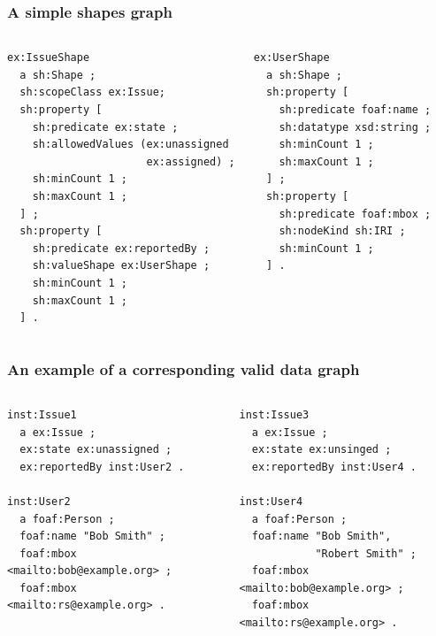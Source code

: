 \documentclass{beamer}
\begin{document}
\begin{frame}[fragile]
  \frametitle{A simple shapes graph}

  \begin{columns}[t]

    \begin{Verbatim}[fontsize=\footnotesize]
ex:IssueShape
  a sh:Shape ;
  sh:scopeClass ex:Issue;
  sh:property [
    sh:predicate ex:state ;
    sh:allowedValues (ex:unassigned
                      ex:assigned) ;
    sh:minCount 1 ;
    sh:maxCount 1 ;
  ] ;
  sh:property [
    sh:predicate ex:reportedBy ;
    sh:valueShape ex:UserShape ;
    sh:minCount 1 ;
    sh:maxCount 1 ;
  ] .
    \end{Verbatim}


    \begin{Verbatim}[fontsize=\footnotesize]
ex:UserShape
  a sh:Shape ;
  sh:property [
    sh:predicate foaf:name ;
    sh:datatype xsd:string ;
    sh:minCount 1 ;
    sh:maxCount 1 ;
  ] ;
  sh:property [
    sh:predicate foaf:mbox ;
    sh:nodeKind sh:IRI ;
    sh:minCount 1 ;
  ] .
    \end{Verbatim}
  \end{columns}
\end{frame}

\begin{frame}[fragile]
  \frametitle{An example of a corresponding valid data graph}

  \begin{columns}[t]

    \begin{Verbatim}[fontsize=\footnotesize]
inst:Issue1
  a ex:Issue ;
  ex:state ex:unassigned ;
  ex:reportedBy inst:User2 .

inst:User2
  a foaf:Person ;
  foaf:name "Bob Smith" ;
  foaf:mbox <mailto:bob@example.org> ;
  foaf:mbox <mailto:rs@example.org> .
    \end{Verbatim}


    \begin{Verbatim}[fontsize=\footnotesize]
inst:Issue3
  a ex:Issue ;
  ex:state ex:unsinged ;
  ex:reportedBy inst:User4 .

inst:User4
  a foaf:Person ;
  foaf:name "Bob Smith",
            "Robert Smith" ;
  foaf:mbox <mailto:bob@example.org> ;
  foaf:mbox <mailto:rs@example.org> .
    \end{Verbatim}
  \end{columns}
\end{frame}
\end{document}
